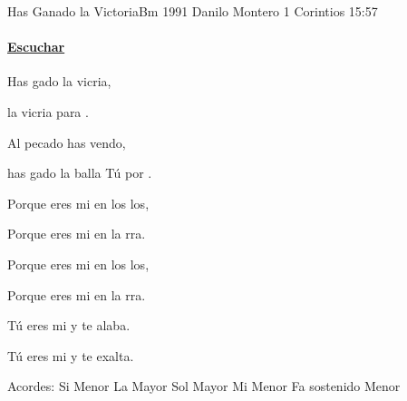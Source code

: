 \documentclass[12pt, spanish]{book}
\begin{document}
    \begin{song}{Has Ganado la Victoria}{Bm}
    {1991} %
    {Danilo Montero}
    {1 Corintios 15:57} %
    {}
        \ifChordBk
            \paragraph{\mbox{}\hfill\protect\href{https://open.spotify.com/intl-es/track/0Xx8W0qIS5Ok8fBgaRSUhm}{Escuchar}\mbox{}\hfill}
        \fi


        \begin{SBOpGroup}
            Has gado la vicria,

            la vicria para .

            Al pecado has vendo,

            has gado la balla Tú por .
        \end{SBOpGroup}

        \begin{SBChorus}
            Porque  eres mi  en los los,

            Porque  eres mi  en la rra.

            Porque  eres mi  en los los,

            Porque  eres mi  en la rra.

            Tú eres mi  y te alaba.

            Tú eres mi  y te exalta.
        \end{SBChorus}

        \ifChordBk
        \begin{SBOpGroup}
            Acordes:\break
            \upchord{\Bm}\qquad Si Menor \hfill
            \upchord{\A}\qquad La Mayor \hfill\null\break
            \upchord{\G}\qquad Sol Mayor \hfill
            \upchord{\Em}\qquad Mi Menor \hfill\null\break
            \upchord{\Fsm}\qquad Fa sostenido Menor \hfill\null\break
        \end{SBOpGroup}
        \fi
    \end{song}
%
\end{document}
